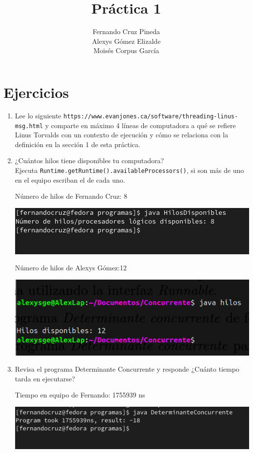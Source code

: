 \documentclass[12pt]{article}
\title{Práctica 1}
\author{Fernando Cruz Pineda \\ Alexys Gómez Elizalde \\ Moisés Corpus García}
\date{}
\begin{document}
\maketitle

\section*{Ejercicios}

\begin{enumerate}
    \item Lee lo siguiente \texttt{https://www.evanjones.ca/software/threading-linus-msg.html} y comparte en máximo 4 líneas de computadora a qué se refiere Linus Torvalds con un contexto de ejecución y cómo se relaciona con la definición en la sección 1 de esta práctica.
    \item ¿Cuántos hilos tiene disponibles tu computadora? \\
      Ejecuta \texttt{Runtime.getRuntime().availableProcessors()}, si son más de uno en el equipo escriban el de cada uno.

      Número de hilos de Fernando Cruz: 8

      \includegraphics[]{Fer.png}

      Número de hilos de Alexys Gómez:12

      \includegraphics[]{1Alexys.png}

    \item Revisa el programa Determinante Concurrente y responde ¿Cuánto tiempo tarda en ejecutarse?

      Tiempo en equipo de Fernando: 1755939 ns

      \includegraphics[]{Fer2.png}


\end{enumerate}
\end{document}
